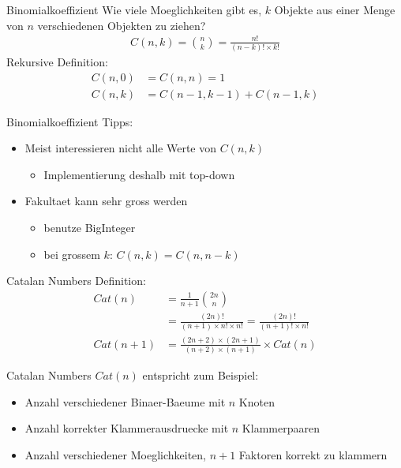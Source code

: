 \documentclass[18pt]{beamer}
\begin{document}
\begin{frame}{Binomialkoeffizient}
Wie viele Moeglichkeiten gibt es, $k$ Objekte aus einer Menge von $n$ verschiedenen Objekten zu ziehen?
\pause
\begin{align*}
C\left( n,k \right) = \binom{n}{k} = \frac{n!}{\left( n-k \right) ! \times k!}
\end{align*}
\pause
Rekursive Definition:
\begin{align*}
C\left( n, 0 \right) &= C\left( n,n \right) = 1 \\
C\left( n,k \right) &= C\left( n-1,k-1 \right) + C\left( n-1,k \right)
\end{align*} %

\end{frame}

\begin{frame}{Binomialkoeffizient}
Tipps:
\begin{itemize}
\item Meist interessieren nicht alle Werte von $C \left( n, k \right)$
\begin{itemize}
\item Implementierung deshalb mit top-down
\end{itemize}
\item Fakultaet kann sehr gross werden
\begin{itemize}
\item benutze BigInteger
\item bei grossem $k$: $C \left( n, k \right) = C \left( n, n-k \right)$
\end{itemize}
\end{itemize}
\end{frame}

\begin{frame}{Catalan Numbers}
Definition:
\begin{align*}
Cat \left( n \right) &= \frac{1}{n+1} \binom{2n}{n} \\
&= \frac{\left( 2n \right)!}{\left( n+1 \right) \times n! \times n!} = \frac{\left( 2n \right) !}{\left( n+1 \right) ! \times n!} \\
Cat \left( n + 1 \right) &= \frac{\left( 2n + 2 \right) \times \left( 2n + 1 \right)}{\left( n + 2 \right) \times \left( n + 1 \right)} \times Cat \left( n \right)
\end{align*}
\end{frame}

\begin{frame}{Catalan Numbers}
$Cat \left( n \right)$ entspricht zum Beispiel:
\begin{itemize}
\item Anzahl verschiedener Binaer-Baeume mit $n$ Knoten
\item Anzahl korrekter Klammerausdruecke mit $n$ Klammerpaaren
\item Anzahl verschiedener Moeglichkeiten, $n+1$ Faktoren korrekt zu klammern
\end{itemize}
\end{frame}
\end{document}
